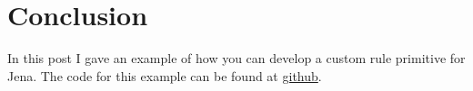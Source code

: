 \documentclass{amsart}
\begin{document}
\section{Conclusion}
In this post I gave an example of how you can develop a custom rule primitive for Jena. The code for this example can be found at \href{https://github.com/henrietteharmse/henrietteharmse/tree/master/blog/tutorial/jena/source/rules/}{github}.

  
  
 
\end{document}
